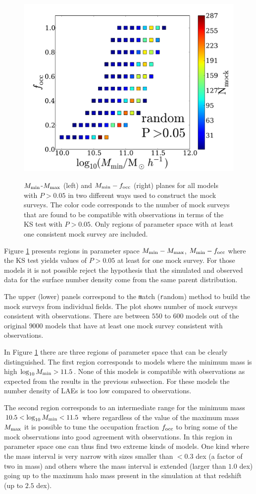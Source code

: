 \documentclass[usenatbib]{mn2e}
\begin{document}
\begin{figure}
\begin{center}
\hspace{5mm}
\includegraphics[width=0.49\linewidth,angle=0]{./plots/Fig3_random_P5.pdf}\\
\end{center} 
\caption{$M_{\rm min}$-$M_{\rm max}$ (left) and $M_{\rm
    min}-f_{\rm occ}$ (right) planes for all models with
  $P>0.05$ in two different ways used to construct the mock
  surveys. The color code corresponds to the number of mock surveys
  that are found to be compatible with observations in terms of the KS
  test with $P>0.05$. Only regions of parameter space with at least
  one consistent mock survey are included. \label{fig:landscape}}   
\end{figure}


Figure \ref{fig:landscape} presents regions in parameter space $M_{\rm
min}-M_{\rm max}$, $M_{\rm min}-f_{\rm occ}$ where the KS test yields
values of $P>0.05$ at least for one mock survey. For those models it
is not possible reject the hypothesis that the simulated and observed
data for the surface number density come from the same parent
distribution.

The upper (lower) panels correspond to the {\texttt match} ({\texttt
  random}) method to build the mock surveys from individual
fields. The plot shows number of mock surveys consistent
with observations. There are between $550$ to $600$ models out of the
original $9000$ models that have at least one mock survey
consistent with observations. 


In Figure \ref{fig:landscape} there are three regions of parameter
space that can be clearly distinguished. The first region corresponds
to models where the minimum mass is high $\log_{10}M_{\rm min}>
11.5$. None of this models is compatible with observations as expected
from the results in the previous subsection. For these models the number
density of LAEs is too low compared to observations.

The second region corresponds to an intermediate range for the minimum
mass $10.5<\log_{10}M_{\rm min}<11.5$ where regardless of the value of
the maximum mass $M_{\rm max}$ it is possible to tune the occupation
fraction $f_{\rm occ}$ to bring some of the mock observations into
good agreement with observations. In this region in parameter space
one can thus find two extreme kinds of models.  One kind where the
mass interval is very narrow with sizes smaller than $<0.3$ dex (a
factor of two in mass) and others where the mass interval is 
extended (larger than $1.0$ dex) going up to the maximum halo mass
present in the simulation at that redshift (up to $2.5$ dex). 
\end{document}
